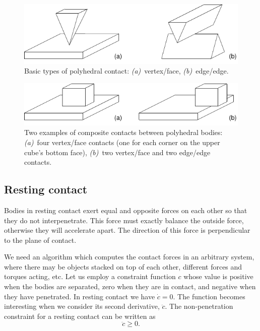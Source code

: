 \begin{figure}
\centerline{\includegraphics{figures/contacts1}}
\caption{Basic types of polyhedral contact: \emph{(a)}~vertex/face, \emph{(b)}~edge/edge.
    \label{contacts1Figure}}
\end{figure}

\begin{figure}
\centerline{\includegraphics{figures/contacts2}}
\caption{Two examples of composite contacts between polyhedral bodies:
    \emph{(a)}~four vertex/face contacts (one for each corner on the upper cube's bottom face),
    \emph{(b)}~two vertex/face and two edge/edge contacts.
    \label{contacts2Figure}}
\end{figure}


\subsection{Resting contact\label{restingContact}}

Bodies in resting contact exert equal and opposite forces on each other so that they do not
interpenetrate. This force must exactly balance the outside force, otherwise they will accelerate
apart. The direction of this force is perpendicular to the plane of contact.

We need an algorithm which computes the contact forces in an arbitrary system, where there may be
objects stacked on top of each other, different forces and torques acting, etc. Let us employ a
constraint function $c$ whose value is positive when the bodies are separated, zero when they are
in contact, and negative when they have penetrated. In resting contact we have $\dot{c} = 0$. The
function becomes interesting when we consider its second derivative, $\ddot{c}$. The
non-penetration constraint for a resting contact can be written as
\begin{equation} \label{constrInequality}
\ddot{c} \ge 0.
\end{equation}

